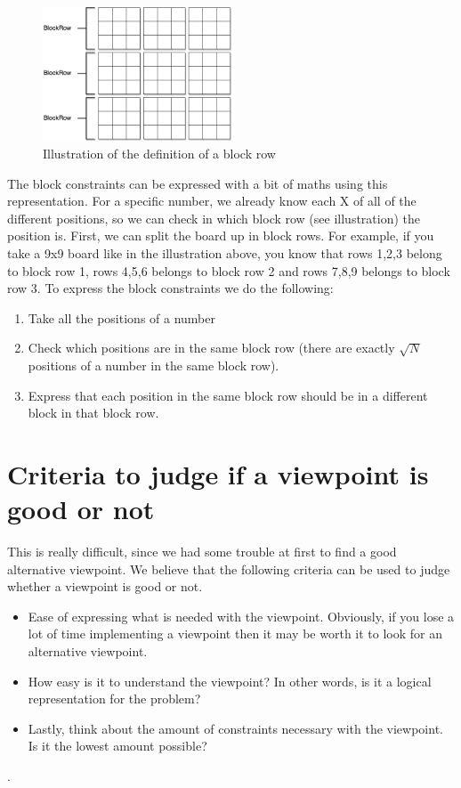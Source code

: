 \documentclass{report}
\begin{document}
\begin{figure}[h]
\centering
\includegraphics[width=0.5\textwidth]{blockRow}
\caption{Illustration of the definition of a block row}
\end{figure}

The block constraints can be expressed with a bit of maths using this representation. For a specific number, we already know each X of all of the different positions, so we can check in which block row (see illustration) the position is. First, we can split the board up in block rows. For example, if you take a 9x9 board like in the illustration above, you know that rows 1,2,3 belong to block row 1, rows 4,5,6 belongs to block row 2 and rows 7,8,9 belongs to block row 3. To express the block constraints we do the following:
\begin{enumerate}
	\item Take all the positions of a number
	\item Check which positions are in the same block row (there are exactly $\sqrt{N}$ positions of a number in the same block row).
	\item Express that each position in the same block row should be in a different block in that block row.
\end{enumerate}

\section{Criteria to judge if a viewpoint is good or not}
This is really difficult, since we had some trouble at first to find a good alternative viewpoint. We believe that the following criteria can be used to judge whether a viewpoint is good or not.
\begin{itemize}
    \item Ease of expressing what is needed with the viewpoint. Obviously, if you lose a lot of time implementing a viewpoint then it may be worth it to look for an alternative viewpoint.
    \item How easy is it to understand the viewpoint? In other words, is it a logical representation for the problem?
    \item Lastly, think about the amount of constraints necessary with the viewpoint. Is it the lowest amount possible?
\end{itemize}.
\end{document}
